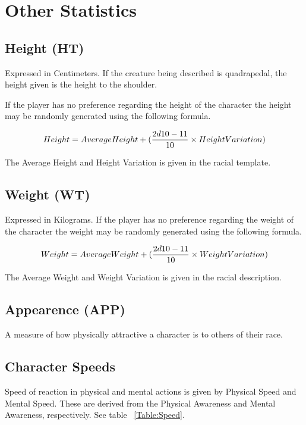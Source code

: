 


\section{Other Statistics}

\subsection{Height (HT)} Expressed in Centimeters. If the creature
being described is quadrapedal, the height given is the height
to the shoulder.

If the player has no preference regarding the height of the character
the height may be randomly generated using the following formula.

\[ Height = {Average Height} + ( {{2d10 - 11} \over {10}} \times
{Height Variation} )
\]

The Average Height and Height Variation is given in the racial
template.

\subsection{Weight (WT)} Expressed in Kilograms. If the player has no 
preference regarding the weight of the character the weight may be 
randomly generated using the following formula. 

\[ Weight = {Average Weight} + ( {{2d10 - 11} \over {10}} \times
{Weight Variation})
\]

The Average Weight and Weight Variation is given in the racial
description.

\subsection{Appearence        (APP)}
A measure of how physically attractive a character is
to others of their race.

\subsection{Character Speeds}

Speed of reaction in physical and mental actions is given by 
Physical Speed and Mental Speed. These are derived from the
Physical Awareness and Mental Awareness, respectively. See table 
~\ref{Table:Speed}.




